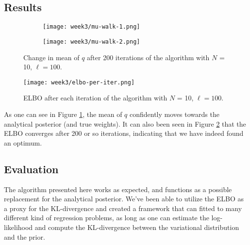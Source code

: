\subsection{Results}
\begin{figure}[H]
  \centering
  \begin{subfigure}{0.4\textwidth}
    \texttt{[image: week3/mu-walk-1.png]}
  \end{subfigure}
  \begin{subfigure}{0.4\textwidth}
    \texttt{[image: week3/mu-walk-2.png]}
  \end{subfigure}
  \caption{Change in mean of $q$ after 200 iterations of the algorithm with $N$ = 10, $\ell = 100$.}
  \label{fig:mu-walk}
\end{figure}
\begin{figure}[H]
  \centering
  \texttt{[image: week3/elbo-per-iter.png]}
  \caption{ELBO after each iteration of the algorithm with $N$ = 10, $\ell = 100$.}
  \label{fig:elbo}
\end{figure}
As one can see in Figure \ref{fig:mu-walk}, the mean of $q$ confidently moves towards the analytical posterior (and true weights).
It can also been seen in Figure \ref{fig:elbo} that the ELBO converges after 200 or so iterations, indicating that we have indeed found an optimum.
\subsection{Evaluation}
The algorithm presented here works as expected, and functions as a possible replacement for the analytical posterior.
We've been able to utilize the ELBO as a proxy for the KL-divergence and created a framework that can fitted to many different kind of regression problems, 
as long as one can estimate the log-likelihood and compute the KL-divergence between the variational distribution and the prior.


